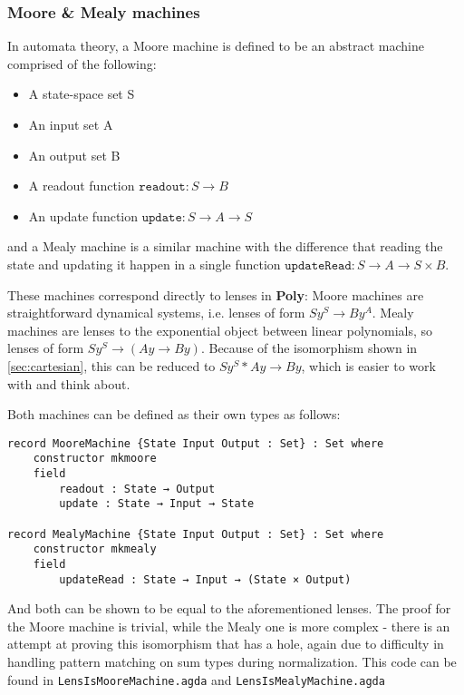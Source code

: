 \subsubsection{Moore \& Mealy machines}
In automata theory, a Moore machine is defined to be an abstract machine comprised of the following:
\begin{itemize}
    \item A state-space set S
    \item An input set A
    \item An output set B
    \item A readout function $\texttt{readout} : S \rightarrow B$
    \item An update function $\texttt{update} : S \rightarrow A \rightarrow S$
\end{itemize}

and a Mealy machine is a similar machine with the difference that reading the state and updating it happen in a single function $\texttt{updateRead} : S \rightarrow A \rightarrow S \times B$.

These machines correspond directly to lenses in \textbf{Poly}: Moore machines are straightforward dynamical systems, i.e.  lenses of form $Sy^S \rightarrow By^A$. Mealy machines are lenses to the exponential object between linear polynomials, so lenses of form $Sy^S \rightarrow (Ay \rightarrow By)$. Because of the isomorphism shown in \ref{sec:cartesian}, this can be reduced to $Sy^S * Ay \rightarrow By$, which is easier to work with and think about.

Both machines can be defined as their own types as follows:

\begin{verbatim}
record MooreMachine {State Input Output : Set} : Set where
    constructor mkmoore
    field
        readout : State → Output
        update : State → Input → State

record MealyMachine {State Input Output : Set} : Set where
    constructor mkmealy
    field
        updateRead : State → Input → (State × Output)
\end{verbatim}

And both can be shown to be equal to the aforementioned lenses. The proof for the Moore machine is trivial, while the Mealy one is more complex - there is an attempt at proving this isomorphism that has a hole, again due to difficulty in handling pattern matching on sum types during normalization. This code can be found in \texttt{LensIsMooreMachine.agda} and \texttt{LensIsMealyMachine.agda}

